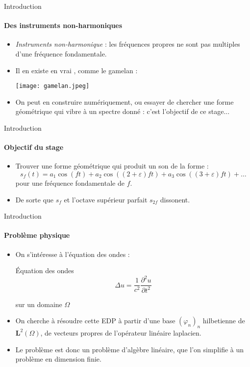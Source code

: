 \documentclass{beamer}
\newcommand{\f}{\frac}
\begin{document}
\begin{frame}{Introduction}
\framesubtitle{Des instruments non-harmoniques}

\begin{itemize}
    \item \emph{Instruments non-harmonique} : les fréquences propres ne sont pas multiples d'une fréquence fondamentale.
    \item Il en existe en \og vrai \fg{}, comme le gamelan :
    \begin{center}
        \texttt{[image: gamelan.jpeg]}
    \end{center}
    \item On peut en construire numériquement, ou essayer de chercher une forme géométrique qui vibre à un spectre donné : c'est l'objectif de ce stage...
\end{itemize}
    
\end{frame}

\begin{frame}{Introduction}
\framesubtitle{Objectif du stage}

\begin{itemize}
    \item Trouver une forme géométrique qui produit un son de la forme :
    $$ s_f(t) = a_1 \cos(ft) + a_2 \cos((2+\varepsilon)ft) + a_3 \cos((3+\varepsilon)ft) + \dots $$
    pour une fréquence fondamentale de $f$.
    \item De sorte que $s_f$ et l'octave supérieur parfait  $s_{2f}$ dissonent.
    
\end{itemize}
\end{frame}


\begin{frame}{Introduction}
\framesubtitle{Problème physique}
\begin{itemize}
    \item On s'intéresse à l'équation des ondes :


\begin{block}{Équation des ondes}
$$ \Delta u = \f{1}{c^2} \frac{\partial^2 u}{\partial t^2}   $$
\end{block}

sur un domaine $\Omega$

\item On cherche à résoudre cette EDP à partir d'une base $(\varphi_n)_n$ hilbetienne de $\mathbf{L}^2(\Omega)$, de vecteurs propres de l'opérateur linéaire laplacien.

\item Le problème est donc un problème d'algèbre linéaire, que l'on simplifie à un problème en dimension finie.

\end{itemize}

\end{frame}
\end{document}
